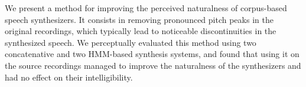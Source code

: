 We present a method for improving the perceived naturalness of corpus-based speech synthesizers. It consists in removing pronounced pitch peaks in the
 original recordings, which typically lead to noticeable discontinuities in the
 synthesized speech. We perceptually evaluated this method using two
 concatenative and two HMM-based synthesis systems, and found that using it on
 the source recordings managed to improve the naturalness of the synthesizers
 and had no effect on their intelligibility.

